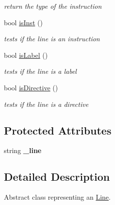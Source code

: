 \begin{DoxyCompactItemize}
\begin{DoxyCompactList}\small\item\em return the type of the instruction \item\end{DoxyCompactList}\item 
\hypertarget{classLine_a57e724949fa0828dfdd2a1bb0f7db8d0}{
bool \hyperlink{classLine_a57e724949fa0828dfdd2a1bb0f7db8d0}{isInst} ()}
\label{classLine_a57e724949fa0828dfdd2a1bb0f7db8d0}

\begin{DoxyCompactList}\small\item\em tests if the line is an instruction \item\end{DoxyCompactList}\item 
\hypertarget{classLine_a8323f3df960924826199bd607198ac7f}{
bool \hyperlink{classLine_a8323f3df960924826199bd607198ac7f}{isLabel} ()}
\label{classLine_a8323f3df960924826199bd607198ac7f}

\begin{DoxyCompactList}\small\item\em tests if the line is a label \item\end{DoxyCompactList}\item 
\hypertarget{classLine_ad014e40a75c8a04e6a091ae4110579bc}{
bool \hyperlink{classLine_ad014e40a75c8a04e6a091ae4110579bc}{isDirective} ()}
\label{classLine_ad014e40a75c8a04e6a091ae4110579bc}

\begin{DoxyCompactList}\small\item\em tests if the line is a directive \item\end{DoxyCompactList}\end{DoxyCompactItemize}
\subsection*{Protected Attributes}
\begin{DoxyCompactItemize}
\item 
\hypertarget{classLine_a41059923f5c8e5a0f4f44d84bd8762aa}{
string {\bfseries \_\-line}}
\label{classLine_a41059923f5c8e5a0f4f44d84bd8762aa}

\end{DoxyCompactItemize}


\subsection{Detailed Description}
Abstract class representing an \hyperlink{classLine}{Line}. 

